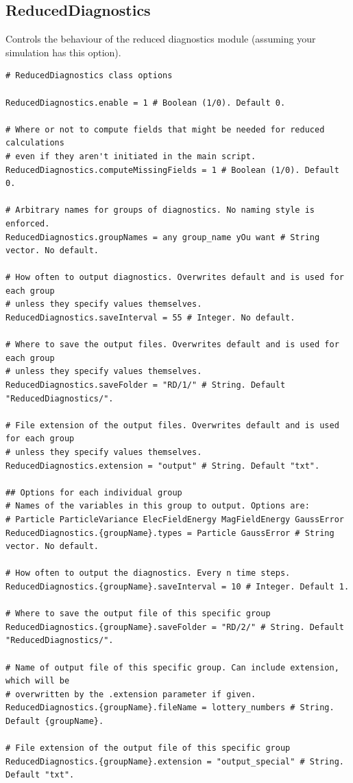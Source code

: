 \documentclass[11pt]{article}
\begin{document}
\subsection{ReducedDiagnostics}
Controls the behaviour of the reduced diagnostics module (assuming your simulation has this option).
\begin{lstlisting}[language=pkgconfig]
# ReducedDiagnostics class options

ReducedDiagnostics.enable = 1 # Boolean (1/0). Default 0.

# Where or not to compute fields that might be needed for reduced calculations
# even if they aren't initiated in the main script.
ReducedDiagnostics.computeMissingFields = 1 # Boolean (1/0). Default 0.

# Arbitrary names for groups of diagnostics. No naming style is enforced.
ReducedDiagnostics.groupNames = any group_name yOu want # String vector. No default.

# How often to output diagnostics. Overwrites default and is used for each group 
# unless they specify values themselves.
ReducedDiagnostics.saveInterval = 55 # Integer. No default.

# Where to save the output files. Overwrites default and is used for each group
# unless they specify values themselves.
ReducedDiagnostics.saveFolder = "RD/1/" # String. Default "ReducedDiagnostics/".

# File extension of the output files. Overwrites default and is used for each group
# unless they specify values themselves.
ReducedDiagnostics.extension = "output" # String. Default "txt".

## Options for each individual group
# Names of the variables in this group to output. Options are:
# Particle ParticleVariance ElecFieldEnergy MagFieldEnergy GaussError
ReducedDiagnostics.{groupName}.types = Particle GaussError # String vector. No default.

# How often to output the diagnostics. Every n time steps.
ReducedDiagnostics.{groupName}.saveInterval = 10 # Integer. Default 1.

# Where to save the output file of this specific group
ReducedDiagnostics.{groupName}.saveFolder = "RD/2/" # String. Default "ReducedDiagnostics/".

# Name of output file of this specific group. Can include extension, which will be
# overwritten by the .extension parameter if given.
ReducedDiagnostics.{groupName}.fileName = lottery_numbers # String. Default {groupName}.

# File extension of the output file of this specific group
ReducedDiagnostics.{groupName}.extension = "output_special" # String. Default "txt".

\end{lstlisting}
\end{document}
